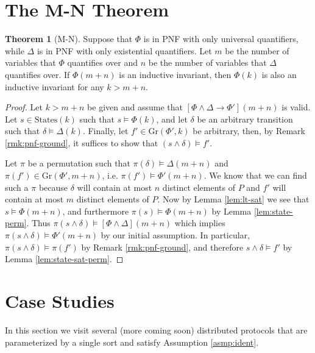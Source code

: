 \documentclass[12pt]{article}
\theoremstyle{definition}
\newtheorem{theorem}{Theorem}
\theoremstyle{remark}
\newcommand{\states}{\text{States}}
\newcommand{\gr}{\text{Gr}}
\begin{document}
\section{The M-N Theorem}
\begin{theorem}[M-N]
  Suppose that $\Phi$ is in PNF with only universal quantifiers, while $\Delta$ is in PNF with only existential quantifiers.  Let $m$ be the number of variables that $\Phi$ quantifies over and $n$ be the number of variables that $\Delta$ quantifies over.  If $\Phi(m+n)$ is an inductive invariant, then $\Phi(k)$ is also an inductive invariant for any $k>m+n$.
\end{theorem}
\begin{proof}
  Let $k>m+n$ be given and assume that $[\Phi\land\Delta \rightarrow \Phi'](m+n)$ is valid.  Let $s \in \states(k)$ such that $s \models \Phi(k)$, and let $\delta$ be an arbitrary transition such that $\delta \models \Delta(k)$.  Finally, let $f' \in \gr(\Phi',k)$ be arbitrary, then, by Remark \ref{rmk:pnf-ground}, it suffices to show that $(s \land \delta) \models f'$.

  Let $\pi$ be a permutation such that $\pi(\delta) \models \Delta(m+n)$ and $\pi(f') \in \gr(\Phi',m+n)$, i.e. $\pi(f') \models \Phi'(m+n)$.  We know that we can find such a $\pi$ because $\delta$ will contain at most $n$ distinct elements of $P$ and $f'$ will contain at most $m$ distinct elements of $P$.  Now by Lemma \ref{lem:lt-sat} we see that $s \models \Phi(m+n)$, and furthermore $\pi(s) \models \Phi(m+n)$ by Lemma \ref{lem:state-perm}.  Thus $\pi(s \land \delta) \models [\Phi\land\Delta](m+n)$ which implies $\pi(s \land \delta) \models \Phi'(m+n)$ by our initial assumption.  In particular, $\pi(s \land \delta) \models \pi(f')$ by Remark \ref{rmk:pnf-ground}, and therefore $s \land \delta \models f'$ by Lemma \ref{lem:state-sat-perm}.
\end{proof}



\section{Case Studies}
In this section we visit several (more coming soon) distributed protocols that are parameterized by a single sort and satisfy Assumption \ref{asmp:ident}.
\end{document}
